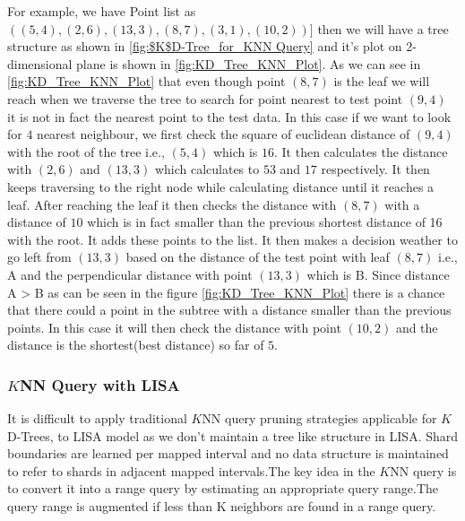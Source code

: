 \begin{mscexample}
	For example, we have Point list as $((5,4),(2,6),(13,3),(8,7),(3,1),(10,2))]$ then we will have a tree structure as shown in \ref{fig:$K$D-Tree_for_KNN Query} and it's plot on $2$-dimensional plane is shown in \ref{fig:KD_Tree_KNN_Plot}. As we can see in \ref{fig:KD_Tree_KNN_Plot} that even though point $(8,7)$ is the leaf we will reach when we traverse the tree to search for point nearest to test point $(9,4)$ it is not in fact the nearest point to the test data. In this case if we want to look for $4$ nearest neighbour, we first check the square of euclidean distance of $(9,4)$ with the root of the tree i.e., $(5,4)$ which is $16$. It then calculates the distance with $(2,6)$ and $(13,3)$ which calculates to $53$ and $17$ respectively. It then keeps traversing to the right node while calculating distance until it reaches a leaf. After reaching the leaf it then checks the distance with $(8,7)$ with a distance of $10$ which is in fact smaller than the previous shortest distance of 16 with the root. It adds these points to the list. It then makes a decision weather to go left from $(13,3)$ based on the distance of the test point with leaf $(8,7)$ i.e., A and the perpendicular distance with point $(13,3)$ which is B. Since distance A > B as can be seen in the figure \ref{fig:KD_Tree_KNN_Plot} there is a chance that there could a point in the subtree with a distance smaller than the previous points. In this case it will then check the distance with point $(10,2)$ and the distance is the shortest(best distance) so far of $5$. 
\end{mscexample}



\subsubsection{$K$NN Query with LISA}
It is difficult to apply traditional $K$NN query pruning strategies applicable for $K$D-Trees, to LISA model as we don't maintain a tree like structure in LISA. Shard boundaries are learned per mapped interval and no data structure is maintained to refer to shards in adjacent mapped intervals.The key idea in the $K$NN query is to convert it into a range query by estimating an appropriate query range.The query range is augmented if less than K neighbors are found in a range query.

